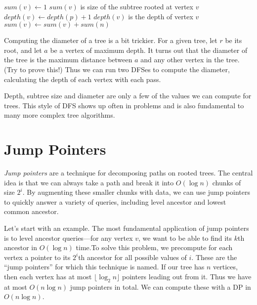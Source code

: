 \noindent \begin{minipage}{\textwidth}
\begin{algorithmic}
  \State $sum(v) \gets 1$
  \Comment $sum(v)$ is size of the subtree rooted at vertex $v$
  \State $depth(v) \gets depth(p) + 1$
  \Comment $depth(v)$ is the depth of vertex $v$
      \State {}
      \State $sum(v) \gets sum(v) + sum(n)$
    \EndIf
  \EndFor
\EndFunction
\end{algorithmic}
\end{minipage}

Computing the diameter of a tree is a bit trickier. For a given tree, let $r$ be its root, and let $a$ be a vertex of maximum depth. It turns out that the diameter of the tree is the maximum distance between $a$ and any other vertex in the tree. (Try to prove this!) Thus we can run two DFSes to compute the diameter, calculating the depth of each vertex with each pass.

Depth, subtree size and diameter are only a few of the values we can compute for trees. This style of DFS shows up often in problems and is also fundamental to many more complex tree algorithms.

\section{Jump Pointers}

\emph{Jump pointers} are a technique for decomposing paths on rooted trees. The central idea is that we can always take a path and break it into $O(\log n)$ chunks of size $2^i$. By augmenting these smaller chunks with data, we can use jump pointers to quickly answer a variety of queries, including level ancestor and lowest common ancestor.

Let's start with an example. The most fundamental application of jump pointers is to level ancestor queries---for any vertex $v$, we want to be able to find its $k$th ancestor in $O(\log n)$ time.To solve this problem, we precompute for each vertex a pointer to its $2^i$th ancestor for all possible values of $i$. These are the ``jump pointers'' for which this technique is named. If our tree has $n$ vertices, then each vertex has at most $\lfloor \log_2 n \rfloor$ pointers leading out from it. Thus we have at most $O(n \log n)$ jump pointers in total. We can compute these with a DP in $O(n \log n)$.

